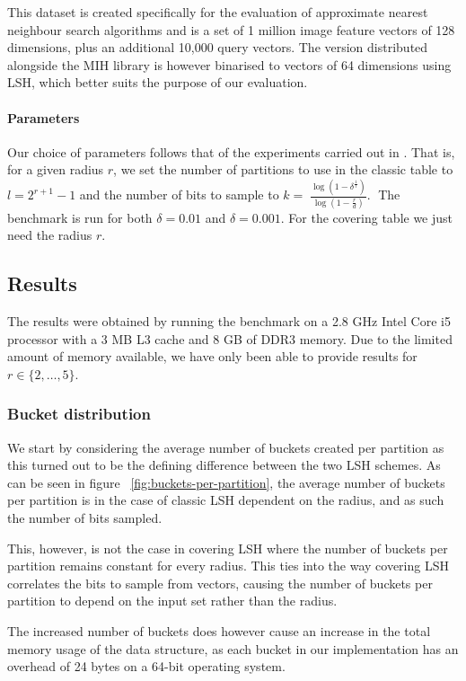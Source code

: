 This dataset is created specifically for the evaluation of approximate nearest neighbour search algorithms and is a set of 1 million image feature vectors of 128 dimensions, plus an additional 10,000 query vectors. The version distributed alongside the MIH library is however binarised to vectors of 64 dimensions using LSH, which better suits the purpose of our evaluation.

\paragraph{Parameters} Our choice of parameters follows that of the experiments carried out in \cite{DBLP:journals/corr/PhamP16}. That is, for a given radius $r$, we set the number of partitions to use in the classic table to $l = 2^{r + 1} - 1$ and the number of bits to sample to $k = 􏰢\frac{\log(1 - \delta^{\frac{1}{l}})}{\log(1 - \frac{r}{d})}$.􏰣 The benchmark is run for both $\delta = 0.01$ and $\delta = 0.001$. For the covering table we just need the radius $r$.

\subsection{Results}

The results were obtained by running the benchmark on a 2.8 GHz Intel Core i5 processor with a 3 MB L3 cache and 8 GB of DDR3 memory. Due to the limited amount of memory available, we have only been able to provide results for $r \in \{2,\ldots,5\}$.

\subsubsection{Bucket distribution}

We start by considering the average number of buckets created per partition as this turned out to be the defining difference between the two LSH schemes. As can be seen in figure ~\ref{fig:buckets-per-partition}, the average number of buckets per partition is in the case of classic LSH dependent on the radius, and as such the number of bits sampled.

This, however, is not the case in covering LSH where the number of buckets per partition remains constant for every radius. This ties into the way covering LSH correlates the bits to sample from vectors, causing the number of buckets per partition to depend on the input set rather than the radius.

The increased number of buckets does however cause an increase in the total memory usage of the data structure, as each bucket in our implementation has an overhead of 24 bytes on a 64-bit operating system.

